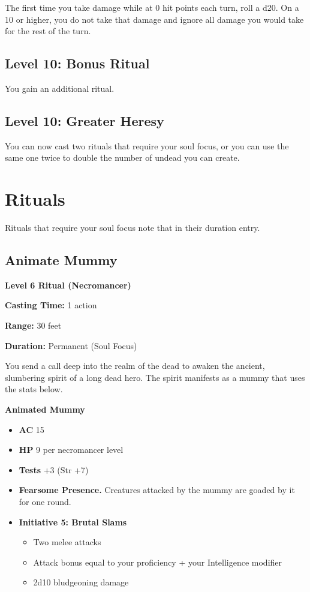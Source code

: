 \documentclass[12pt,letterpaper,twocolumn,openany,nodeprecatedcode,bg=none]{dndbook}
\providecommand{\tightlist}{%
  \setlength{\itemsep}{0pt}\setlength{\parskip}{0pt}}
\begin{document}
The first time you take damage while at 0 hit points each turn, roll a
d20. On a 10 or higher, you do not take that damage and ignore all
damage you would take for the rest of the turn.

\subsection{Level 10: Bonus Ritual}\label{level-10-bonus-ritual}

You gain an additional ritual.

\subsection{Level 10: Greater Heresy}\label{level-10-greater-heresy}

You can now cast two rituals that require your soul focus, or you can
use the same one twice to double the number of undead you can create.

\clearpage

\section{Rituals}\label{rituals}

Rituals that require your soul focus note that in their duration entry.

\subsection{Animate Mummy}\label{animate-mummy}

\textbf{Level 6 Ritual (Necromancer)}

\textbf{Casting Time:} 1 action

\textbf{Range:} 30 feet

\textbf{Duration:} Permanent (Soul Focus)

You send a call deep into the realm of the dead to awaken the ancient,
slumbering spirit of a long dead hero. The spirit manifests as a mummy
that uses the stats below.

\textbf{Animated Mummy}

\begin{itemize}
\tightlist
\item
  \textbf{AC} 15
\item
  \textbf{HP} 9 per necromancer level
\item
  \textbf{Tests} +3 (Str +7)
\item
  \textbf{Fearsome Presence.} Creatures attacked by the mummy are goaded
  by it for one round.
\item
  \textbf{Initiative 5: Brutal Slams}

  \begin{itemize}
  \tightlist
  \item
    Two melee attacks
  \item
    Attack bonus equal to your proficiency + your Intelligence modifier
  \item
    2d10 bludgeoning damage
  \end{itemize}
\end{itemize}
\end{document}
